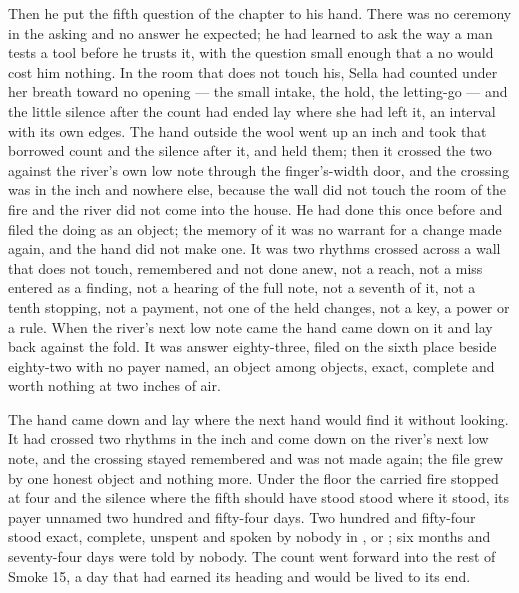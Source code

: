Then he put the fifth question of the chapter to his hand. There was no ceremony in the asking and no answer he expected; he had learned to ask the way a man tests a tool before he trusts it, with the question small enough that a no would cost him nothing. In the room that does not touch his, Sella had counted under her breath toward no opening --- the small intake, the hold, the letting-go --- and the little silence after the count had ended lay where she had left it, an interval with its own edges. The hand outside the wool went up an inch and took that borrowed count and the silence after it, and held them; then it crossed the two against the river's own low note through the finger's-width door, and the crossing was in the inch and nowhere else, because the wall did not touch the room of the fire and the river did not come into the house. He had done this once before and filed the doing as an object; the memory of it was no warrant for a change made again, and the hand did not make one. It was two rhythms crossed across a wall that does not touch, remembered and not done anew, not a reach, not a miss entered as a finding, not a hearing of the full note, not a seventh of it, not a tenth stopping, not a payment, not one of the held changes, not a key, a power or a rule. When the river's next low note came the hand came down on it and lay back against the fold. It was answer eighty-three, filed on the sixth place beside eighty-two with no payer named, an object among objects, exact, complete and worth nothing at two inches of air.

The hand came down and lay where the next hand would find it without looking. It had crossed two rhythms in the inch and come down on the river's next low note, and the crossing stayed remembered and was not made again; the file grew by one honest object and nothing more. Under the floor the carried fire stopped at four and the silence where the fifth should have stood stood where it stood, its payer unnamed two hundred and fifty-four days. Two hundred and fifty-four stood exact, complete, unspent and spoken by nobody in ,  or ; six months and seventy-four days were told by nobody. The count went forward into the rest of Smoke 15, a day that had earned its heading and would be lived to its end.
